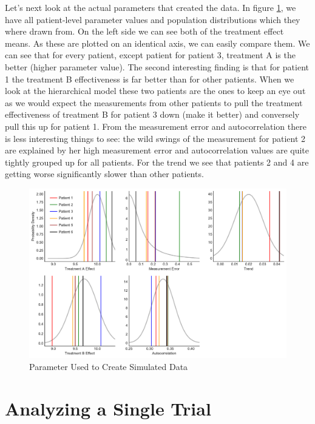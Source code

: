 \documentclass[12pt,a4paper,leqno]{report}
\theoremstyle{plain}
\theoremstyle{definition}
\theoremstyle{remark}
\begin{document}
Let's next look at the actual parameters that created the data. In figure
\ref{parameterdistribution}, we have all patient-level parameter values and population
distributions which they where drawn from. On the left side we can see both of the
treatment effect means. As these are plotted on an identical axis, we can easily compare
them. We can see that for every patient, except patient for patient 3, treatment A is
the better (higher parameter value). The second interesting finding is that for patient
1 the treatment B effectiveness is far better than for other patients. When we look at
the hierarchical model these two patients are the ones to keep an eye out as we would
expect the measurements from other patients to pull the treatment effectiveness of
treatment B for patient 3 down (make it better) and conversely pull this up for patient 1. From the measurement error and autocorrelation
there is less interesting things to see: the wild swings of the measurement for patient 2
are explained by her high measurement error and autocorrelation values are quite tightly
grouped up for all patients. For the trend we see that patients 2 and 4 are getting
worse significantly slower than other patients.

\begin{figure}[H]
    \label{parameterdistribution}
    \caption{Parameter Used to Create Simulated Data}
    \includegraphics[width=\textwidth,height=\textheight,keepaspectratio]{population_parameter_distributions.pdf}
\end{figure}

\section{Analyzing a Single Trial}\label{1trial}
\end{document}
